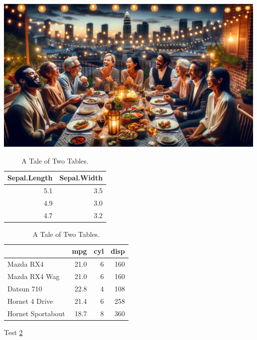 \documentclass[
]{book}
\begin{document}
\includegraphics[width=1\linewidth]{images/dalle-friendships}

\begin{table}
\caption{\label{tab:tab-9-1}A Tale of Two Tables.}

\centering
\begin{tabular}[t]{rr}
\toprule
Sepal.Length & Sepal.Width\\
\midrule
5.1 & 3.5\\
4.9 & 3.0\\
4.7 & 3.2\\
\bottomrule
\end{tabular}
\centering
\begin{tabular}[t]{lrrr}
\toprule
  & mpg & cyl & disp\\
\midrule
Mazda RX4 & 21.0 & 6 & 160\\
Mazda RX4 Wag & 21.0 & 6 & 160\\
Datsun 710 & 22.8 & 4 & 108\\
Hornet 4 Drive & 21.4 & 6 & 258\\
Hornet Sportabout & 18.7 & 8 & 360\\
\bottomrule
\end{tabular}
\end{table}

Test \ref{tab:tab-9-1}
\end{document}
